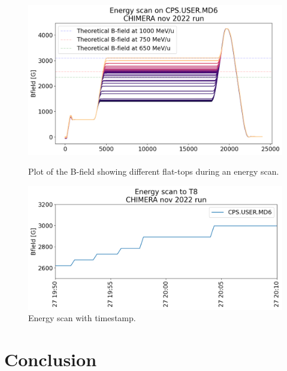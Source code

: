 \documentclass{cernatsnote}
\begin{document}
\begin{figure}[!htb]
    \centering
    \begin{minipage}{0.45\textwidth}
        \centering
        \includegraphics[width=1.0\textwidth]{images/PS_BEAM_ENERGY/energy_scan_chimera 1.png}
        \caption{Plot of the B-field showing different flat-tops during an energy scan.}
        \label{fig:energy_scan}
    \end{minipage}\hfill
    \begin{minipage}{0.45\textwidth}
        \centering
        \includegraphics[width=1.0\textwidth]{images/PS_BEAM_ENERGY/energy_scan_timestamp_chimera 1.png} 
        \caption{Energy scan with timestamp.}
        \label{fig:energy_scan_timestamp}
    \end{minipage}
\end{figure}



\section{Conclusion}
\end{document}
